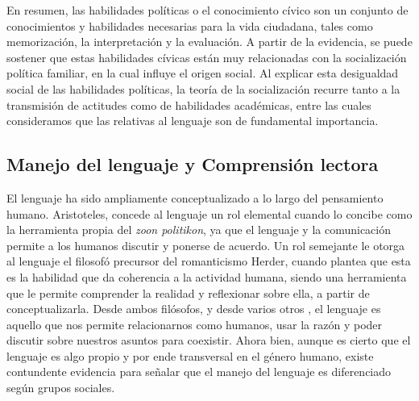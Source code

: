 \documentclass[12pt,twoside]{templates/facsothesis}
\begin{document}
En resumen, las habilidades políticas o el conocimiento cívico son un conjunto de conocimientos y habilidades necesarias para la vida ciudadana, tales como memorización, la interpretación y la evaluación. A partir de la evidencia, se puede sostener que estas habilidades cívicas están muy relacionadas con la socialización política familiar, en la cual influye el origen social. Al explicar esta desigualdad social de las habilidades políticas, la teoría de la socialización recurre tanto a la transmisión de actitudes como de habilidades académicas, entre las cuales consideramos que las relativas al lenguaje son de fundamental importancia.

\hypertarget{manejo-del-lenguaje-y-comprensiuxf3n-lectora}{%
\subsection{Manejo del lenguaje y Comprensión lectora}\label{manejo-del-lenguaje-y-comprensiuxf3n-lectora}}

El lenguaje ha sido ampliamente conceptualizado a lo largo del pensamiento humano. Aristoteles, concede al lenguaje un rol elemental cuando lo concibe como la herramienta propia del \emph{zoon politikon}, ya que el lenguaje y la comunicación permite a los humanos discutir y ponerse de acuerdo. Un rol semejante le otorga al lenguaje el filosofó precursor del romanticismo Herder, cuando plantea que esta es la habilidad que da coherencia a la actividad humana, siendo una herramienta que le permite comprender la realidad y reflexionar sobre ella, a partir de conceptualizarla. Desde ambos filósofos, y desde varios otros \citep[ej.][]{echeverria_Ontologia_2011, garcia_LENGUAJE_2013}, el lenguaje es aquello que nos permite relacionarnos como humanos, usar la razón y poder discutir sobre nuestros asuntos para coexistir. Ahora bien, aunque es cierto que el lenguaje es algo propio y por ende transversal en el género humano, existe contundente evidencia para señalar que el manejo del lenguaje es diferenciado según grupos sociales.
\end{document}

